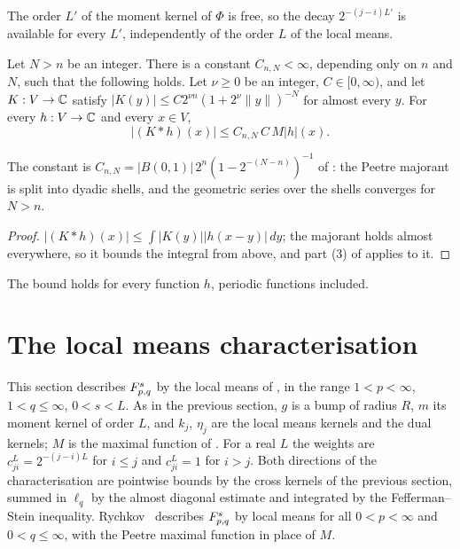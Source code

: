 The order $L'$ of the moment kernel of $\Phi$ is free, so the decay $2^{-(j-i)L'}$ is available
for every $L'$, independently of the order $L$ of the local means.

\begin{theorem}
\label{thm:decay-kernels-maximal}
\leanok
{}
Let $N > n$ be an integer. There is a constant $C_{n,N} < \infty$, depending only on $n$ and
$N$, such that the following holds. Let $\nu \geq 0$ be an integer, $C \in [0, \infty)$, and let
$K : V \to \mathbb{C}$ satisfy $|K(y)| \leq C 2^{\nu n} (1 + 2^\nu \|y\|)^{-N}$ for almost every $y$.
For every $h : V \to \mathbb{C}$ and every $x \in V$,
\[
  |(K * h)(x)| \leq C_{n,N} \, C \, M|h|(x) .
\]
\end{theorem}

The constant is $C_{n,N} = |B(0, 1)| \, 2^n (1 - 2^{-(N - n)})^{-1}$ of
: the Peetre majorant is split into dyadic shells, and the
geometric series over the shells converges for $N > n$.

\begin{proof}
\leanok
$|(K * h)(x)| \leq \int |K(y)| |h(x - y)| \, dy$; the majorant holds almost everywhere, so it
bounds the integral from above, and part (3) of  applies to
it.
\end{proof}

The bound holds for every function $h$, periodic functions included.

\section{The local means characterisation}
\label{sec:tl-local-means}

This section describes $F^{s}_{p,q}$ by the local means of , in the range
$1 < p < \infty$, $1 < q \leq \infty$, $0 < s < L$. As in the previous section, $g$ is a bump of
radius $R$, $m$ its moment kernel of order $L$, and $k_j$, $\eta_j$ are the local means kernels
and the dual kernels; $M$ is the maximal function of . For a real
$L$ the weights are $c^L_{ji} = 2^{-(j-i)L}$ for $i \leq j$ and $c^L_{ji} = 1$ for $i > j$.
Both directions of the characterisation are pointwise bounds by the cross kernels of the
previous section, summed in $\ell_q$ by the almost diagonal estimate and integrated by the
Fefferman--Stein inequality. Rychkov~\cite{Rychkov} describes $F^{s}_{p,q}$ by local means for
all $0 < p < \infty$ and $0 < q \leq \infty$, with the Peetre maximal function in place of $M$.


